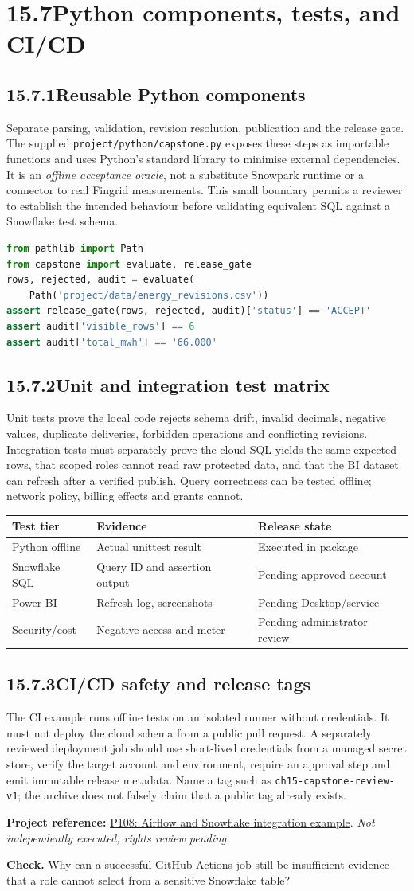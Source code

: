 \documentclass[11pt,twoside]{article}
\newcommand{\topic}[2]{\subsection*{#1\quad #2}}
\newcommand{\repo}[2]{\par\begingroup\fontsize{8.0}{9.6}\selectfont\sffamily\color{inkgray}\textbf{Project reference:} \href{#2}{#1}. \textit{Not independently executed; rights review pending.}\par\endgroup}
\begin{document}
\newpage

\section*{15.7\quad Python components, tests, and CI/CD}
\topic{15.7.1}{Reusable Python components}
Separate parsing, validation, revision resolution, publication and the release gate. The supplied \texttt{project/python/capstone.py} exposes these steps as importable functions and uses Python's standard library to minimise external dependencies. It is an \emph{offline acceptance oracle}, not a substitute Snowpark runtime or a connector to real Fingrid measurements. This small boundary permits a reviewer to establish the intended behaviour before validating equivalent SQL against a Snowflake test schema.
\begin{lstlisting}[language=Python]
from pathlib import Path
from capstone import evaluate, release_gate
rows, rejected, audit = evaluate(
    Path('project/data/energy_revisions.csv'))
assert release_gate(rows, rejected, audit)['status'] == 'ACCEPT'
assert audit['visible_rows'] == 6
assert audit['total_mwh'] == '66.000'
\end{lstlisting}
\topic{15.7.2}{Unit and integration test matrix}
Unit tests prove the local code rejects schema drift, invalid decimals, negative values, duplicate deliveries, forbidden operations and conflicting revisions. Integration tests must separately prove the cloud SQL yields the same expected rows, that scoped roles cannot read raw protected data, and that the BI dataset can refresh after a verified publish. Query correctness can be tested offline; network policy, billing effects and grants cannot.
\begin{center}\small\begin{tabularx}{\linewidth}{@{}p{30mm}X X@{}}\toprule
Test tier & Evidence & Release state\\\midrule
Python offline & Actual unittest result & Executed in package\\
Snowflake SQL & Query ID and assertion output & Pending approved account\\
Power BI & Refresh log, screenshots & Pending Desktop/service\\
Security/cost & Negative access and meter & Pending administrator review\\\bottomrule\end{tabularx}\end{center}
\topic{15.7.3}{CI/CD safety and release tags}
The CI example runs offline tests on an isolated runner without credentials. It must not deploy the cloud schema from a public pull request. A separately reviewed deployment job should use short-lived credentials from a managed secret store, verify the target account and environment, require an approval step and emit immutable release metadata. Name a tag such as \texttt{ch15-capstone-review-v1}; the archive does not falsely claim that a public tag already exists.
\repo{P108: Airflow and Snowflake integration example}{https://github.com/astronomer/etl-elt-airflow-snowflake}
\textbf{Check.} Why can a successful GitHub Actions job still be insufficient evidence that a role cannot select from a sensitive Snowflake table?
\end{document}
